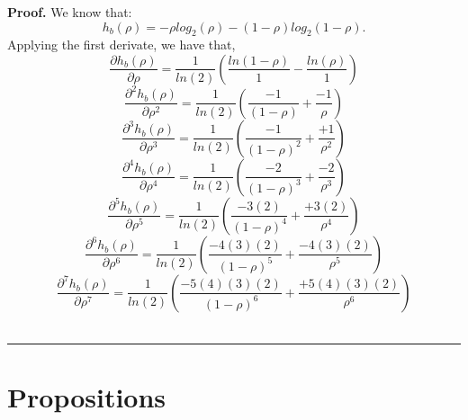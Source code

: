 \documentclass[a4paper,10pt]{article}
\newenvironment{myproof}[1][Proof]{\textbf{#1.} }{\ \rule{0.5em}{0.5em}}
\begin{document}
\begin{myproof}\label{proof:Dnhrho}
We know that:
\begin{equation}\label{eq:ProofDnhrho_0}
h_{b}(\rho) = -\rho log_2(\rho) -(1-\rho) log_2(1-\rho).
\end{equation}
Applying the first derivate, we have that,
\begin{equation}\label{eq:ProofDnhrho_1}
 \frac{\partial  h_{b}(\rho)}{\partial \rho}  = \frac{1}{ln(2)} \left(\frac{ln(1-\rho)}{1}-\frac{ln(\rho)}{1}\right)
\end{equation}
\begin{equation}\label{eq:ProofDnhrho_2}
 \frac{\partial^2 h_{b}(\rho)}{\partial\rho^2}= \frac{1}{ln(2)} \left(\frac{-1}{(1-\rho)}+\frac{-1}{\rho}\right)
\end{equation}
\begin{equation}\label{eq:ProofDnhrho_3}
 \frac{\partial^3 h_{b}(\rho)}{\partial\rho^3}= \frac{1}{ln(2)} \left(\frac{-1}{(1-\rho)^2}+\frac{+1}{\rho^2}\right)
\end{equation}
\begin{equation}\label{eq:ProofDnhrho_4}
 \frac{\partial^4 h_{b}(\rho)}{\partial\rho^4}= \frac{1}{ln(2)} \left(\frac{-2}{(1-\rho)^3}+\frac{-2}{\rho^3}\right)
\end{equation}
\begin{equation}\label{eq:ProofDnhrho_5}
 \frac{\partial^5 h_{b}(\rho)}{\partial\rho^5}= \frac{1}{ln(2)} \left(\frac{-3(2)}{(1-\rho)^4}+\frac{+3(2)}{\rho^4}\right)
\end{equation}
\begin{equation}\label{eq:ProofDnhrho_6}
 \frac{\partial^6 h_{b}(\rho)}{\partial\rho^6}= \frac{1}{ln(2)} \left(\frac{-4(3)(2)}{(1-\rho)^5}+\frac{-4(3)(2)}{\rho^5}\right)
\end{equation}
\begin{equation}\label{eq:ProofDnhrho_7}
 \frac{\partial^7 h_{b}(\rho)}{\partial\rho^7}= \frac{1}{ln(2)} \left(\frac{-5(4)(3)(2)}{(1-\rho)^6}+\frac{+5(4)(3)(2)}{\rho^6}\right)
\end{equation}
\end{myproof}




\section{Propositions}
\label{sec:Propositions}
\end{document}
